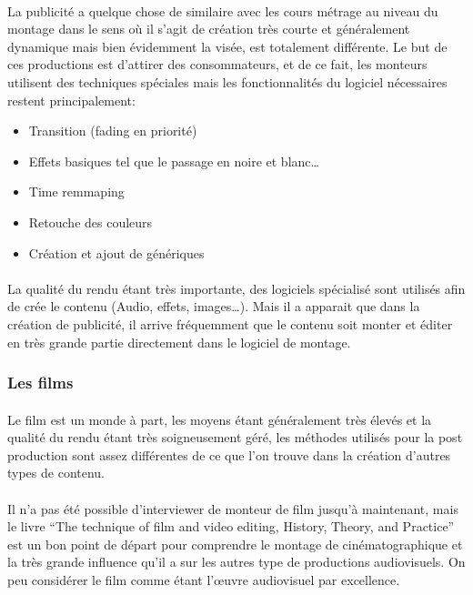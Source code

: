       \paragraph{}
        La publicité a quelque chose de similaire avec les cours métrage au niveau du
        montage dans le sens où il s'agit de création très courte et généralement dynamique
        mais bien évidemment la visée, est totalement différente. Le but de ces productions
        est d'attirer des consommateurs, et de ce fait, les monteurs utilisent des
        techniques spéciales mais les fonctionnalités du logiciel nécessaires restent
        principalement:
          \begin{itemize}
            \item{Transition (fading en priorité)}
            \item{Effets basiques tel que le passage en noire et blanc\ldots}
            \item{Time remmaping}
            \item{Retouche des couleurs}
            \item{Création et ajout de génériques}
          \end{itemize}

      \paragraph{}
        La qualité du rendu étant très importante, des logiciels spécialisé sont utilisés
        afin de crée le contenu (Audio, effets, images\ldots). Mais il a apparait que dans
        la création de publicité, il arrive fréquemment que le contenu soit monter et
        éditer en très grande partie directement dans le logiciel de montage.

    \subsubsection {Les films}
      \paragraph{}
        Le film est un monde à part, les moyens étant généralement très élevés et la
        qualité du rendu étant très soigneusement géré, les méthodes utilisés
        pour la post production sont assez différentes de ce que l'on trouve dans la
        création d'autres types de contenu.

      \paragraph{}
        Il n'a pas été possible d'interviewer de monteur de film jusqu'à maintenant, mais
        le livre ``The technique of film and video editing, History, Theory, and Practice''
        \cite{TheTechniqueOfFilmAndVideoEditing} est un bon point de départ pour
        comprendre le montage de cinématographique et la très grande influence qu'il a
        sur les autres type de productions audiovisuels. On peu considérer le film comme
        étant l'œuvre audiovisuel par excellence. %

